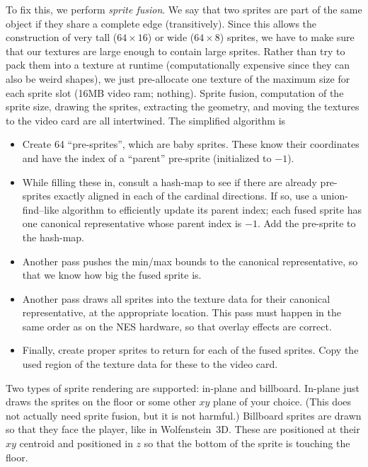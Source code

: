 \documentclass[twocolumn]{article}
\begin{document}
To fix this, we perform {\it sprite fusion}. We say that two sprites
are part of the same object if they share a complete edge
(transitively). Since this allows the construction of very tall ($64
\times 16$) or wide ($64 \times 8$) sprites, we have to make sure that
our textures are large enough to contain large sprites. Rather than
try to pack them into a texture at runtime (computationally expensive
since they can also be weird shapes), we just pre-allocate one texture
of the maximum size for each sprite slot (16MB video ram; nothing).
Sprite fusion, computation of the sprite size, drawing the sprites,
extracting the geometry, and moving the textures to the video card are
all intertwined. The simplified algorithm is

\begin{itemize}
\item Create 64 ``pre-sprites'', which are baby sprites. These know
  their coordinates and have the index of a ``parent'' pre-sprite
  (initialized to $-1$).
\item While filling these in, consult a hash-map to see if there are
  already pre-sprites exactly aligned in each of the cardinal
  directions. If so, use a union-find--like algorithm\cite{tarjan1975efficiency}
  to efficiently update its parent index; each fused sprite has one
  canonical representative whose parent index is $-1$. Add the
  pre-sprite to the hash-map.
\item Another pass pushes the min/max bounds to the canonical representative,
  so that we know how big the fused sprite is.
\item Another pass draws all sprites into the texture data for their
  canonical representative, at the appropriate location. This pass must
  happen in the same order as on the NES hardware, so that overlay effects
  are correct.
\item Finally, create proper sprites to return for each of the fused sprites.
  Copy the used region of the texture data for these to the video card.
\end{itemize}


Two types of sprite rendering are supported: in-plane and billboard.
In-plane just draws the sprites on the floor or some other $xy$ plane
of your choice. (This does not actually need sprite fusion, but it is
not harmful.) Billboard sprites are drawn so that they face the
player, like in Wolfenstein~3D. These are positioned at their $xy$
centroid and positioned in $z$ so that the bottom of the sprite is
touching the floor.
\end{document}

